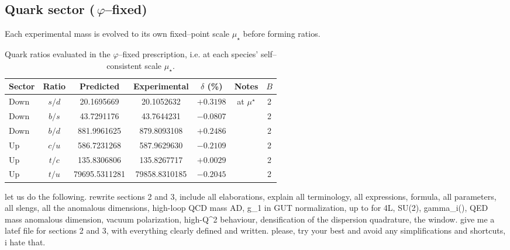 \documentclass[%
 amsmath,amssymb,
 aps,
prb,
floatfix, showkeys
]{revtex4-2}
\begin{document}
\subsection{Quark sector (\,$\varphi$--fixed)}
Each experimental mass is evolved to its own fixed--point scale $\mu_\star$ before forming ratios.
\begin{table}[H]
\caption{Quark ratios evaluated in the $\varphi$--fixed prescription, i.e. at each species' self--consistent scale $\mu_\star$.}
\label{tab:quarks}
\begin{tabular}{l c c c c c c}
\hline
Sector & Ratio & Predicted & Experimental & $\delta$ (\%) & Notes & $B$ \\
\hline
Down & $s/d$ & 20.1695669   & 20.1052632   & $+0.3198$ & at $\mu^\star$ & 2 \\
Down & $b/s$ & 43.7291176   & 43.7644231   & $-0.0807$ &                & 2 \\
Down & $b/d$ & 881.9961625  & 879.8093108  & $+0.2486$ &                & 2 \\
Up   & $c/u$ & 586.7231268  & 587.9629630  & $-0.2109$ &                & 2 \\
Up   & $t/c$ & 135.8306806  & 135.8267717  & $+0.0029$ &                & 2 \\
Up   & $t/u$ & 79695.5311281 & 79858.8310185 & $-0.2045$ &               & 2 \\
\hline
\end{tabular}
\end{table}


































        let us do the following. rewrite sections 2 and 3, include all elaborations, explain all terminology, all expressions, formula, all parameters, all slengs,  all the anomalous dimensions, high-loop QCD mass AD, g_1 in GUT normalization, up to for 4L, SU(2), gamma_i(\mu), QED mass anomalous dimension, vacuum polarization,  high-Q^2 behaviour, densification of the dispersion quadrature, the \tau window. give me a latef file for sections 2 and 3,  with everything clearly defined and written. please, try your best and avoid any simplifications and shortcuts, i hate that.
\end{document}
